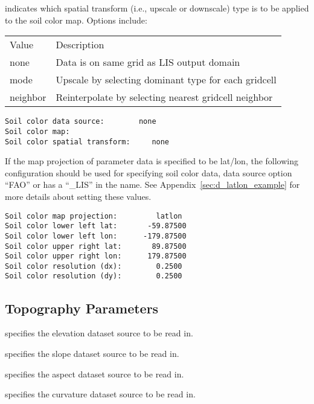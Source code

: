   indicates which spatial transform
 (i.e., upscale or downscale) type is to be applied to the soil color
 map.  Options include:

 \begin{tabular}{ll}
 Value & Description                                          \\
 none  & Data is on same grid as LIS output domain            \\
 mode  & Upscale by selecting dominant type for each gridcell \\
 neighbor  & Reinterpolate by selecting nearest gridcell neighbor \\
 \end{tabular}
 

 \begin{Verbatim}[frame=single]
Soil color data source:        none
Soil color map:         
Soil color spatial transform:     none
 \end{Verbatim}

 
 If the map projection of parameter data is specified to be lat/lon,
 the following configuration should be used for specifying soil color
 data, data source option ``FAO'' or has a ``\_LIS'' in the name. 
 See Appendix~\ref{sec:d_latlon_example} for more details about
 setting these values.
 

 \begin{Verbatim}[frame=single]
Soil color map projection:         latlon
Soil color lower left lat:       -59.87500
Soil color lower left lon:      -179.87500
Soil color upper right lat:       89.87500
Soil color upper right lon:      179.87500
Soil color resolution (dx):        0.2500
Soil color resolution (dy):        0.2500
 \end{Verbatim}


 
 \subsection{Topography Parameters} \label{ssec:topoparams}
 

 
  specifies the elevation
 dataset source to be read in.  

  specifies the slope
 dataset source to be read in.  

  specifies the aspect
 dataset source to be read in.  

  specifies the curvature
 dataset source to be read in.  

